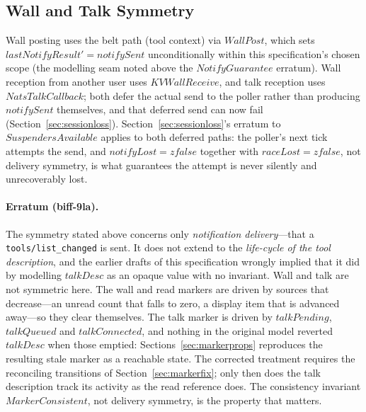 \documentclass[a4paper,10pt,fleqn]{article}
\begin{document}
\subsection{Wall and Talk Symmetry}

Wall posting uses the belt path (tool context) via $WallPost$, which
sets $lastNotifyResult' = notifySent$ unconditionally within this
specification's chosen scope (the modelling seam noted above the
$NotifyGuarantee$ erratum).  Wall reception from another user uses
$KVWallReceive$, and talk reception uses $NatsTalkCallback$; both defer
the actual send to the poller rather than producing $notifySent$
themselves, and that deferred send can now fail
(Section~\ref{sec:sessionloss}).  Section~\ref{sec:sessionloss}'s
erratum to $SuspendersAvailable$ applies to both deferred paths: the
poller's next tick attempts the send, and $notifyLost = zfalse$ together
with $raceLost = zfalse$, not delivery symmetry, is what guarantees the
attempt is never silently and unrecoverably lost.

\paragraph{Erratum (biff-9la).}  The symmetry stated above concerns only
\emph{notification delivery}---that a \texttt{tools/list\_changed} is
sent.  It does not extend to the \emph{life-cycle of the tool
description}, and the earlier drafts of this specification wrongly implied
that it did by modelling $talkDesc$ as an opaque value with no invariant.
Wall and talk are not symmetric here.  The wall and read markers are
driven by sources that decrease---an unread count that falls to zero, a
display item that is advanced away---so they clear themselves.  The talk
marker is driven by $talkPending$, $talkQueued$ and $talkConnected$, and
nothing in the original model reverted $talkDesc$ when those emptied:
Sections~\ref{sec:markerprops} reproduces the resulting stale marker as a
reachable state.  The corrected treatment requires the reconciling
transitions of Section~\ref{sec:markerfix}; only then does the talk
description track its activity as the read reference does.  The
consistency invariant $MarkerConsistent$, not delivery symmetry, is the
property that matters.
\end{document}
